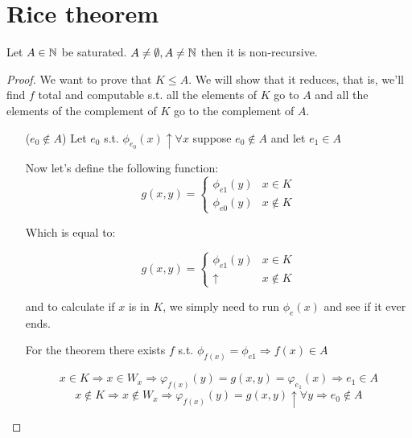 \section {Rice theorem}

\begin{theorem}
  Let $ A \in \mathbb{N} $ be saturated. $ A \neq \emptyset, A \neq \mathbb{N} $
  then it is non-recursive.
\end{theorem}

\begin{proof}
  We want to prove that $ K \leq A $. We will show that it reduces,
  that is, we'll find $f$ total and computable s.t. all the elements
  of $K$ go to $A$ and all the elements of the complement of $K$ go to
  the complement of $A$.

  \begin{itemize}
  \item[($e_0 \notin A$)]
    Let $ e_0$ s.t. $ \phi_{e_0}(x)\uparrow\forall x $ suppose
    $ e_0\notin A $ and let $ e_1\in A $
    
    Now let's define the following function:
    \begin{equation*}
      g(x,y) = \begin{cases}
        \phi_{e1}(y) & x \in K \\
        \phi_{e0}(y) & x \notin K
      \end{cases}
    \end{equation*}

    Which is equal to:

    \begin{equation*}
      g(x,y) =
      \begin{cases}
        \phi_{e1}(y) & x \in K \\
        \uparrow & x \notin K
      \end{cases}
    \end{equation*}

    and to calculate if $x$ is in $K$, we simply need to run $ \phi_e(x) $
    and see if it ever ends.

    For the \smn theorem there exists $f$ s.t.
    $ \phi_{f(x)} = \phi_{e1} \Rightarrow f(x)\in A$

    \begin{equation}\label{eq:one14}
      x \in K
      \Rightarrow x \in W_x
      \Rightarrow \varphi_{f(x)}(y) = g(x,y) = \varphi_{e_1}(x)
      \Rightarrow e_1 \in A
    \end{equation}
    \begin{equation}\label{eq:two14}
      x \notin K
      \Rightarrow x \notin W_x
      \Rightarrow \varphi_{f(x)}(y) = g(x,y)\uparrow \forall y
      \Rightarrow e_0 \notin A
    \end{equation}


\end{itemize}
\end{proof}
